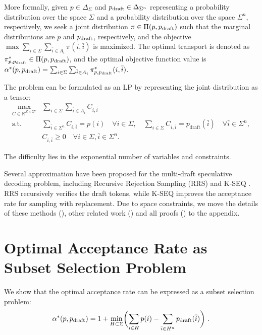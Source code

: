 \documentclass{article}
\makeatletter
\newcommand{\myvspace}{\@ifstar\myvspacestar\myvspacenostar}
\newcommand{\myvspacenostar}[1]{}
\newcommand{\myvspacestar}[1]{}
\newcommand{\crvspace}{\@ifstar\crvspacestar\crvspacenostar}
\newcommand{\crvspacenostar}[1]{}
\newcommand{\crvspacestar}[1]{}
\makeatother
\begin{document}
More formally, given $p\in \Delta_\Sigma$ and $p_{\operatorname{draft}}\in \Delta_{\Sigma^n}$ representing a probability distribution over the space $\Sigma$ and a probability distribution over the space $\Sigma^n$, respectively, we seek a joint distribution $\pi\in\Pi(p,p_{\operatorname{draft}})$ such that the marginal distributions are $p$ and $p_{\operatorname{draft}}$, respectively, and the objective $\max \sum_{i\in\Sigma} \sum_{\bar{i}\in A_i}\pi(i,\bar{i})$ is maximized. The optimal transport is denoted as $\pi^\ast_{p,p_{\operatorname{draft}}}\in\Pi(p,p_{\operatorname{draft}})$, and the optimal objective function value is $\alpha^\ast(p,p_{\operatorname{draft}})=\sum_{i\in\Sigma} \sum_{\bar{i}\in A_i}\pi^\ast_{p,p_{\operatorname{draft}}}(i,\bar{i})$.

The problem can be formulated as an LP by representing the joint distribution as a tensor:
\myvspace{-1pt}
\crvspace{-5pt}
\begin{equation}\label{eq:lp}
\begin{aligned}
\max_{C \in \mathbb{R}^{\Sigma \times \Sigma^n}} & \sum_{i \in \Sigma} \sum_{\bar{i} \in A_i} C_{i,\bar{i}} \\
\text{s.t.~} & \sum_{\bar{i} \in \Sigma^n} C_{i,\bar{i}} = p(i) \quad \forall i \in \Sigma, \quad \sum_{i \in \Sigma} C_{i,\bar{i}} = p_{\text{draft}}(\bar{i}) \quad \forall \bar{i} \in \Sigma^n, \\
& C_{i,\bar{i}} \geq 0 \quad \forall i \in \Sigma, \bar{i} \in \Sigma^n
.
\end{aligned}
\end{equation}
\par\myvspace{-10pt}
\crvspace{-10pt}
The difficulty lies in the exponential number of variables and constraints.



Several approximation have been proposed for the multi-draft speculative decoding problem, including Recursive Rejection Sampling (RRS) \citep{yang2024multi,jeon2024recursive} and K-SEQ \citep{sun2024spectr}. RRS recursively verifies the draft tokens, while K-SEQ improves the acceptance rate for sampling with replacement. Due to space constraints, we move the details of these methods (), other related work () and all proofs () to the appendix. \myvspace{-8pt}
\crvspace{-8pt}
\section{Optimal Acceptance Rate as Subset Selection Problem}\label{se:subset_selection}
\myvspace{-8pt}
\crvspace{-8pt}
We show that the optimal acceptance rate can be expressed as a subset selection problem:
\myvspace{-2pt}
\crvspace{-2pt}
\begin{equation}\label{eq:subset}
\alpha^\ast(p,p_{\opn{draft}})=
1+\min_{H\subset\Sigma} 
\biggl(
\sum_{i\in H} p(i)- \sum_{\bar{i}\in H^n} p_{\opn{draft}}(\bar{i})
\biggl)
~.
\end{equation}
\end{document}
